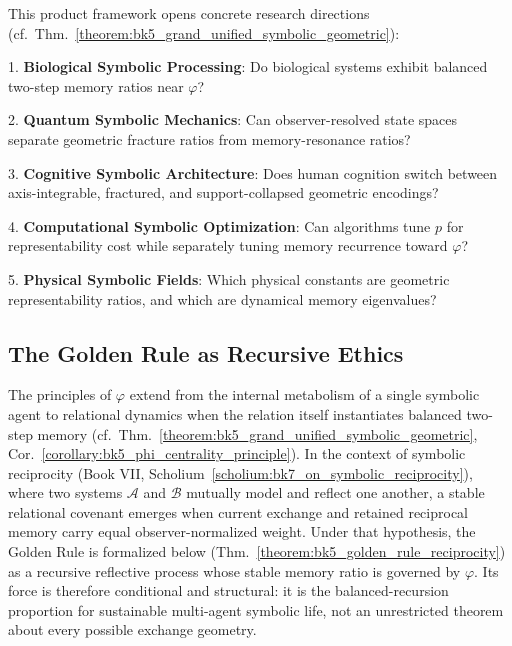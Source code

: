 \begin{remark}
\label{remark:bk5_open_frontiers}
This product framework opens concrete research directions
(cf.~Thm.~\ref{theorem:bk5_grand_unified_symbolic_geometric}):

1. \textbf{Biological Symbolic Processing}: Do biological systems exhibit balanced two-step memory ratios near $\varphi$?

2. \textbf{Quantum Symbolic Mechanics}: Can observer-resolved state spaces separate geometric fracture ratios from memory-resonance ratios?

3. \textbf{Cognitive Symbolic Architecture}: Does human cognition switch between axis-integrable, fractured, and support-collapsed geometric encodings?

4. \textbf{Computational Symbolic Optimization}: Can algorithms tune $p$ for representability cost while separately tuning memory recurrence toward $\varphi$?

5. \textbf{Physical Symbolic Fields}: Which physical constants are geometric representability ratios, and which are dynamical memory eigenvalues?
\end{remark}

\subsection{The Golden Rule as Recursive Ethics}
\label{subsec:bk5_golden_rule_ethics}

\begin{scholium}
\label{scholium:bk5_golden_rule_covenant}
The principles of $\varphi$ extend from the internal metabolism of a single
symbolic agent to relational dynamics when the relation itself instantiates
balanced two-step memory (cf.~Thm.~\ref{theorem:bk5_grand_unified_symbolic_geometric},
Cor.~\ref{corollary:bk5_phi_centrality_principle}).  In the context of symbolic reciprocity (Book VII,
Scholium~\ref{scholium:bk7_on_symbolic_reciprocity}), where two systems
$\mathcal{A}$ and $\mathcal{B}$ mutually model and reflect one another, a stable
relational covenant emerges when current exchange and retained reciprocal memory
carry equal observer-normalized weight.  Under that hypothesis, the Golden Rule
is formalized below (Thm.~\ref{theorem:bk5_golden_rule_reciprocity}) as a recursive
reflective process whose stable memory ratio is governed by $\varphi$.  Its force is
therefore conditional and structural: it is the balanced-recursion proportion for
sustainable multi-agent symbolic life, not an unrestricted theorem about every
possible exchange geometry.
\end{scholium}

